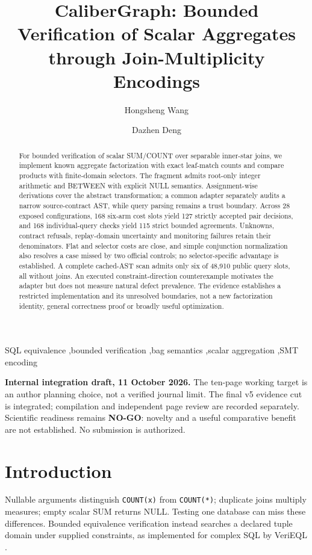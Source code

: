 \documentclass[3p,times,authoryear]{elsarticle}
\begin{document}
\begin{frontmatter}
\title{CaliberGraph: Bounded Verification of Scalar Aggregates through Join-Multiplicity Encodings}
\author{Hongsheng Wang}
\author{Dazhen Deng}
\begin{abstract}
For bounded verification of scalar SUM/COUNT over separable inner-star joins, we implement known aggregate factorization with exact leaf-match counts and compare products with finite-domain selectors. The fragment admits root-only integer arithmetic and BETWEEN with explicit NULL semantics. Assignment-wise derivations cover the abstract transformation; a common adapter separately audits a narrow source-contract AST, while query parsing remains a trust boundary. Across 28 exposed configurations, 168 six-arm cost slots yield 127 strictly accepted pair decisions, and 168 individual-query checks yield 115 strict bounded agreements. Unknowns, contract refusals, replay-domain uncertainty and monitoring failures retain their denominators. Flat and selector costs are close, and simple conjunction normalization also resolves a case missed by two official controls; no selector-specific advantage is established. A complete cached-AST scan admits only six of 48,910 public query slots, all without joins. An executed constraint-direction counterexample motivates the adapter but does not measure natural defect prevalence. The evidence establishes a restricted implementation and its unresolved boundaries, not a new factorization identity, general correctness proof or broadly useful optimization.
\end{abstract}
\begin{keyword}
SQL equivalence \sep bounded verification \sep bag semantics \sep scalar aggregation \sep SMT encoding
\end{keyword}
\end{frontmatter}

\noindent\textbf{Internal integration draft, 11 October 2026.} The ten-page working target is an author planning choice, not a verified journal limit. The final v5 evidence cut is integrated; compilation and independent page review are recorded separately. Scientific readiness remains \textbf{NO-GO}: novelty and a useful comparative benefit are not established. No submission is authorized.

\section{Introduction}
Nullable arguments distinguish \texttt{COUNT(x)} from \texttt{COUNT(*)}; duplicate joins multiply measures; empty scalar SUM returns NULL. Testing one database can miss these differences. Bounded equivalence verification instead searches a declared tuple domain under supplied constraints, as implemented for complex SQL by VeriEQL \citep{he2024verieql}.
\end{document}

